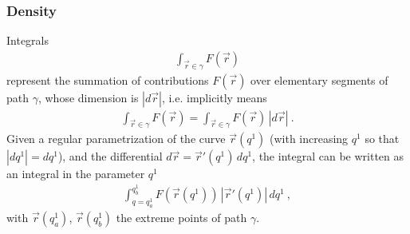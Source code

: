 \documentclass[letterpaper,10pt,english]{jupyterBook}
\begin{document}
\subsubsection{Density}
\label{\detokenize{ch/tensor-algebra-calculus/calculus-euclidean:density}}\label{\detokenize{ch/tensor-algebra-calculus/calculus-euclidean:tensor-calculus-integrals-line-density}}
\sphinxAtStartPar
Integrals
\begin{equation*}
\begin{split} \int_{\vec{r}\in\gamma} F(\vec{r})\end{split}
\end{equation*}
\sphinxAtStartPar
represent the summation of contributions \(F(\vec{r})\) over elementary segments of path \(\gamma\), whose dimension is \(|d \vec{r}|\), i.e. implicitly means
\begin{equation*}
\begin{split}\int_{\vec{r}\in\gamma} F(\vec{r}) = \int_{\vec{r} \in \gamma} F(\vec{r}) \, |d \vec{r}| \ .\end{split}
\end{equation*}
\sphinxAtStartPar
Given a regular parametrization of the curve \(\vec{r}(q^1)\) (with increasing \(q^1\) so that \(|dq^1| = dq^1\)), and the differential \(d \vec{r} = \vec{r}'(q^1) \, d q^1\), the integral can be written as an integral in the parameter \(q^1\)
\begin{equation*}
\begin{split}\int_{q=q^1_a}^{q^1_b} F(\vec{r}(q^1)) \, |\vec{r}'(q^1)| \, dq^1 \ ,\end{split}
\end{equation*}
\sphinxAtStartPar
with \(\vec{r}(q^1_a)\), \(\vec{r}(q^1_b)\) the extreme points of path \(\gamma\).
\end{document}
